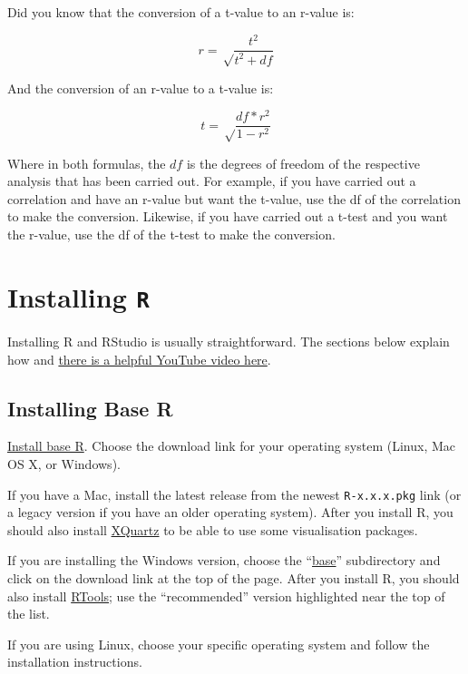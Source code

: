\documentclass[
  oneside]{book}
\begin{document}
Did you know that the conversion of a t-value to an r-value is:

\[r = \sqrt\frac{t^2}{t^2 + df}\]

And the conversion of an r-value to a t-value is:

\[t = \sqrt\frac{df * r^2}{1-r^2}\]

Where in both formulas, the \(df\) is the degrees of freedom of the respective analysis that has been carried out. For example, if you have carried out a correlation and have an r-value but want the t-value, use the df of the correlation to make the conversion. Likewise, if you have carried out a t-test and you want the r-value, use the df of the t-test to make the conversion.

\hypertarget{appendix-appendices}{%
\appendix}


\hypertarget{installing-r}{%
\chapter{\texorpdfstring{Installing \texttt{R}}{Installing R}}\label{installing-r}}

Installing R and RStudio is usually straightforward. The sections below explain how and \href{https://www.youtube.com/watch?v=lVKMsaWju8w}{there is a helpful YouTube video here}.

\hypertarget{installing-base-r}{%
\section{Installing Base R}\label{installing-base-r}}

\href{https://cran.rstudio.com/}{Install base R}. Choose the download link for your operating system (Linux, Mac OS X, or Windows).

If you have a Mac, install the latest release from the newest \texttt{R-x.x.x.pkg} link (or a legacy version if you have an older operating system). After you install R, you should also install \href{http://xquartz.macosforge.org/}{XQuartz} to be able to use some visualisation packages.

If you are installing the Windows version, choose the ``\href{https://cran.rstudio.com/bin/windows/base/}{base}'' subdirectory and click on the download link at the top of the page. After you install R, you should also install \href{https://cran.rstudio.com/bin/windows/Rtools/}{RTools}; use the ``recommended'' version highlighted near the top of the list.

If you are using Linux, choose your specific operating system and follow the installation instructions.
\end{document}
